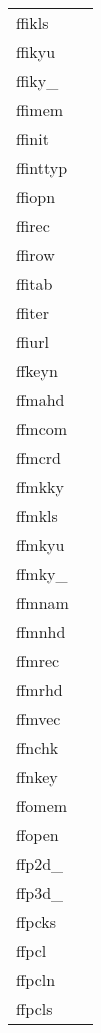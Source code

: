 \documentclass[11pt]{book}
\begin{document}
\begin{tabular}{lr}

ffikls    & \pageref{ffikyx} \\
ffikyu   & \pageref{ffikyu} \\
ffiky\_    & \pageref{ffikyx} \\
ffimem  & \pageref{ffimem} \\
ffinit  & \pageref{ffinit} \\
ffinttyp    & \pageref{ffinttyp} \\
ffiopn & \pageref{ffopen} \\
ffirec     & \pageref{ffirec} \\
ffirow  & \pageref{ffirow} \\
ffitab    & \pageref{ffitab} \\
ffiter   & \pageref{ffiter} \\
ffiurl & \pageref{ffiurl} \\
ffkeyn      & \pageref{ffkeyn} \\
ffmahd     & \pageref{ffmahd} \\
ffmcom    & \pageref{ffmcom} \\
ffmcrd       & \pageref{ffmcrd} \\
ffmkky    & \pageref{ffmkky} \\
ffmkls    & \pageref{ffmkyx} \\
ffmkyu   & \pageref{ffmkyu} \\
ffmky\_    & \pageref{ffmkyx} \\
ffmnam       & \pageref{ffmnam} \\
ffmnhd     & \pageref{ffmnhd} \\
ffmrec     & \pageref{ffmrec} \\
ffmrhd     & \pageref{ffmrhd} \\
ffmvec  & \pageref{ffmvec} \\
ffnchk  & \pageref{ffnchk} \\
ffnkey      & \pageref{ffnkey} \\
ffomem   & \pageref{ffomem} \\
ffopen      & \pageref{ffopen} \\
ffp2d\_   & \pageref{ffp2dx} \\
ffp3d\_   & \pageref{ffp3dx} \\
ffpcks   & \pageref{ffpcks} \\
ffpcl         & \pageref{ffpcl} \\
ffpcln         & \pageref{ffpcln} \\
ffpcls     & \pageref{ffpcls} \\

\end{tabular}
\end{document}
